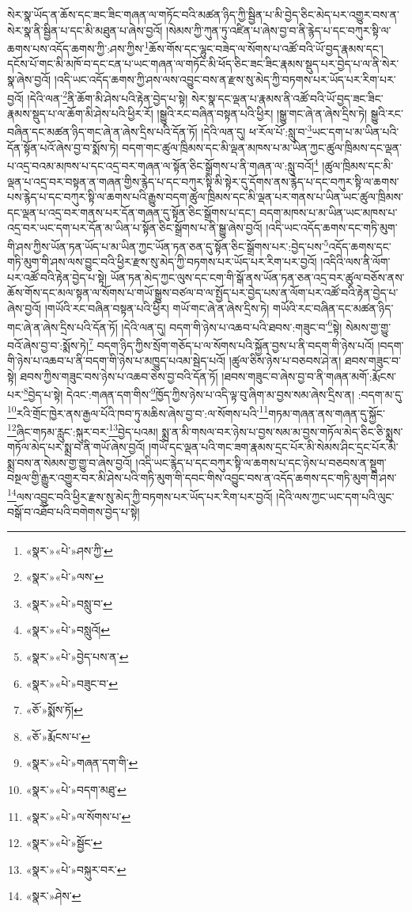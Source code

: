 སེར་སྣ་ཡོད་ན་ཆོས་དང་ཟང་ཟིང་གཞན་ལ་གཏོང་བའི་མཚན་ཉིད་ཀྱི་སྦྱིན་པ་མི་བྱེད་ཅིང་མེད་པར་འགྱུར་བས་ན་སེར་སྣ་ནི་སྦྱིན་པ་དང་མི་མཐུན་པ་ཞེས་བྱའོ། །སེམས་ཀྱི་ཀུན་ཏུ་འཛིན་པ་ཞེས་བྱ་བ་ནི་རྙེད་པ་དང་བཀུར་སྟི་ལ་ཆགས་པས་འདོད་ཆགས་ཀྱི་:ཤས་ཀྱིས་\footnote{«སྣར་»«པེ་»ཤས་ཀྱི་}ཆོས་གོས་དང་ལྷུང་བཟེད་ལ་སོགས་པ་འཚོ་བའི་ཡོ་བྱད་རྣམས་དང་། དངོས་པོ་གང་མི་མཁོ་བ་དང་ངན་པ་ཡང་གཞན་ལ་གཏོང་མི་ཕོད་ཅིང་ཟང་ཟིང་རྣམས་སྡུད་པར་བྱེད་པ་ལ་ནི་སེར་སྣ་ཞེས་བྱའོ། །འདི་ཡང་འདོད་ཆགས་ཀྱི་ཤས་ལས་འབྱུང་བས་ན་རྫས་སུ་མེད་ཀྱི་བཏགས་པར་ཡོད་པར་རིག་པར་བྱའོ། །དེའི་ལན་\footnote{«སྣར་»«པེ་»ལས་}ནི་ཆོག་མི་ཤེས་པའི་རྟེན་བྱེད་པ་སྟེ། སེར་སྣ་དང་ལྡན་པ་རྣམས་ནི་འཚོ་བའི་ཡོ་བྱད་ཟང་ཟིང་རྣམས་སྡུད་པ་ལ་ཆོག་མི་ཤེས་པའི་ཕྱིར་རོ། །སྒྱུའི་རང་བཞིན་བསྟན་པའི་ཕྱིར། །སྒྱུ་གང་ཞེ་ན་ཞེས་དྲིས་ཏེ། སྒྱུའི་རང་བཞིན་དང་མཚན་ཉིད་གང་ཞེ་ན་ཞེས་དྲིས་པའི་དོན་ཏོ། །དེའི་ལན་དུ། ཕ་རོལ་པོ་:སླུ་བ་\footnote{«སྣར་»«པེ་»བསླུ་བ་}ཡང་དག་པ་མ་ཡིན་པའི་དོན་སྟོན་པའོ་ཞེས་བྱ་བ་སྨོས་ཏེ། བདག་གང་ཚུལ་ཁྲིམས་དང་མི་ལྡན་མཁས་པ་མ་ཡིན་ཀྱང་ཚུལ་ཁྲིམས་དང་ལྡན་པ་འདྲ་བའམ་མཁས་པ་དང་འདྲ་བར་གཞན་ལ་སྟོན་ཅིང་སྒྲོགས་པ་ནི་གཞན་ལ་:སླུ་བའོ།\footnote{«སྣར་»«པེ་»བསླུའོ།} །ཚུལ་ཁྲིམས་དང་མི་ལྡན་པ་འདྲ་བར་བསྟན་ན་གཞན་གྱིས་རྙེད་པ་དང་བཀུར་སྟི་མི་སྟེར་དུ་དོགས་ནས་རྙེད་པ་དང་བཀུར་སྟི་ལ་ཆགས་པས་རྙེད་པ་དང་བཀུར་སྟི་ལ་ཆགས་པའི་རྒྱུས་བདག་ཚུལ་ཁྲིམས་དང་མི་ལྡན་པར་གནས་པ་ཡིན་ཡང་ཚུལ་ཁྲིམས་དང་ལྡན་པ་འདྲ་བར་གནས་པར་དོན་གཞན་དུ་སྟོན་ཅིང་སྒྲོགས་པ་དང་། བདག་མཁས་པ་མ་ཡིན་ཡང་མཁས་པ་འདྲ་བར་ཡང་དག་པར་དོན་མ་ཡིན་པ་སྟོན་ཅིང་སྒྲོགས་པ་ནི་སྒྱུ་ཞེས་བྱའོ། །འདི་ཡང་འདོད་ཆགས་དང་གཏི་མུག་གི་ཤས་ཀྱིས་ཡོན་ཏན་ཡོད་པ་མ་ཡིན་ཀྱང་ཡོན་ཏན་ཅན་དུ་སྟོན་ཅིང་སྒྲོགས་པར་:བྱེད་པས་\footnote{«སྣར་»«པེ་»བྱེད་པས་ན་}འདོད་ཆགས་དང་གཏི་མུག་གི་ཤས་ལས་བྱུང་བའི་ཕྱིར་རྫས་སུ་མེད་ཀྱི་བཏགས་པར་ཡོད་པར་རིག་པར་བྱའོ། །འདིའི་ལས་ནི་ལོག་པར་འཚོ་བའི་རྟེན་བྱེད་པ་སྟེ། ཡོན་ཏན་མེད་ཀྱང་ལུས་དང་ངག་གི་སྒོ་ནས་ཡོན་ཏན་ཅན་འདྲ་བར་ཚུལ་བཅོས་ནས་ཆོས་གོས་དང་མལ་སྟན་ལ་སོགས་པ་གཡོ་སྒྱུས་བཙལ་བ་ལ་སྤྱོད་པར་བྱེད་པས་ན་ལོག་པར་འཚོ་བའི་རྟེན་བྱེད་པ་ཞེས་བྱའོ། །གཡོའི་རང་བཞིན་བསྟན་པའི་ཕྱིར། གཡོ་གང་ཞེ་ན་ཞེས་དྲིས་ཏེ། གཡོའི་རང་བཞིན་དང་མཚན་ཉིད་གང་ཞེ་ན་ཞེས་དྲིས་པའི་དོན་ཏོ། །དེའི་ལན་དུ། བདག་གི་ཉེས་པ་འཆབ་པའི་ཐབས་:གཟུང་བ་\footnote{«སྣར་»«པེ་»བཟུང་བ་}སྟེ། སེམས་གྱ་གྱུ་བའོ་ཞེས་བྱ་བ་:སྨོས་ཏེ།\footnote{«ཅོ་»སྨོས་ཏོ།} བདག་ཉིད་ཀྱིས་སྲོག་གཅོད་པ་ལ་སོགས་པའི་སྐྱོན་བྱས་པ་ནི་བདག་གི་ཉེས་པའོ། །བདག་གི་ཉེས་པ་འཆབ་པ་ནི་བདག་གི་ཉེས་པ་མཁྱུད་པའམ་སྦེད་པའོ། །ཚུལ་ཅིས་ཉེས་པ་བཅབས་ཤེ་ན། ཐབས་གཟུང་བ་སྟེ། ཐབས་ཀྱིས་གཟུང་བས་ཉེས་པ་འཆབ་ཅེས་བྱ་བའི་དོན་ཏོ། །ཐབས་གཟུང་བ་ཞེས་བྱ་བ་ནི་གཞན་མགོ་:རྨོངས་པར་\footnote{«ཅོ་»རྨོངས་པ་}བྱེད་པ་སྟེ། དེའང་:གཞན་དག་གིས་\footnote{«སྣར་»«པེ་»གཞན་དག་གི་}ཁྱོད་ཀྱིས་ཉེས་པ་འདི་ལྟ་བུ་ཞིག་མ་བྱས་སམ་ཞེས་དྲིས་ན། :བདག་མ་དུ་\footnote{«སྣར་»«པེ་»བདག་མཐུ་}རའི་གྲོང་ཁྱེར་ནས་རྒྱལ་པོའི་ཁབ་ཏུ་མཆིས་ཞེས་བྱ་བ་:ལ་སོགས་པའི་\footnote{«སྣར་»«པེ་»ལ་སོགས་པ་}གཏམ་གཞན་ནས་གཞན་དུ་སྐྱོང་\footnote{«སྣར་»«པེ་»སྦྱོང་}ཞིང་གཏམ་རླུང་:སྐུར་བར་\footnote{«སྣར་»«པེ་»བསྐུར་བར་}བྱེད་པའམ། སྨྲ་ན་མི་གསལ་བར་ཉེས་པ་བྱས་སམ་མ་བྱས་གཏོལ་མེད་ཅིང་ཅི་སྨྲས་གཏོལ་མེད་པར་སྨྲ་བ་ནི་གཡོ་ཞེས་བྱའོ། །གཡོ་དང་ལྡན་པའི་གང་ཟག་རྣམས་དྲང་པོར་མི་སེམས་ཤིང་དྲང་པོར་མི་སྨྲ་བས་ན་སེམས་གྱ་གྱུ་བ་ཞེས་བྱའོ། །འདི་ཡང་རྙེད་པ་དང་བཀུར་སྟི་ལ་ཆགས་པ་དང་ཉེས་པ་བཅབས་ན་སྡུག་བསྔལ་གྱི་རྒྱུར་འགྱུར་བར་མི་ཤེས་པའི་གཏི་མུག་གི་དབང་གིས་འབྱུང་བས་ན་འདོད་ཆགས་དང་གཏི་མུག་གི་ཤས་\footnote{«སྣར་»ཤེས་}ལས་འབྱུང་བའི་ཕྱིར་རྫས་སུ་མེད་ཀྱི་བཏགས་པར་ཡོད་པར་རིག་པར་བྱའོ། །དེའི་ལས་ཀྱང་ཡང་དག་པའི་ལུང་བསྒོ་བ་འཐོབ་པའི་བགེགས་བྱེད་པ་སྟེ། 